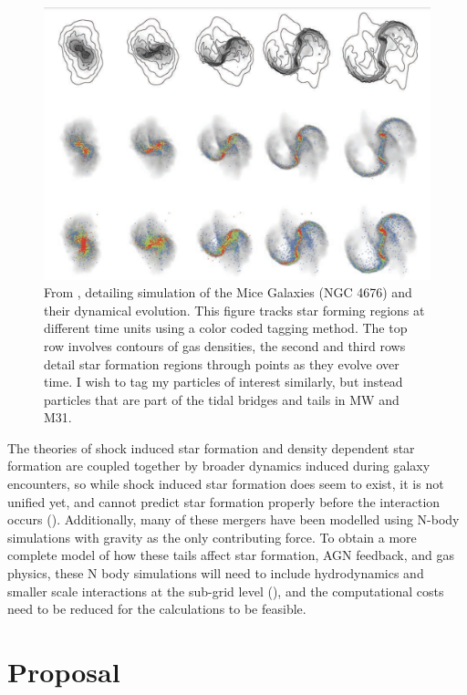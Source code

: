 \documentclass[linenumbers]{aastex631}
\begin{document}
    \begin{figure}[h!]
        \centering
        \includegraphics[scale = 0.3]{galaxy_fig.png}
        \caption{From \cite{barnes2004shock}, detailing simulation of the Mice Galaxies (NGC 4676) and their dynamical evolution. This figure tracks star forming regions at different time units using a color coded tagging method. The top row involves contours of gas densities, the second and third rows detail star formation regions through points as they evolve over time. I wish to tag my particles of interest similarly, but instead particles that are part of the tidal bridges and tails in MW and M31. }
        \label{fig:evolution}
    \end{figure}

    The theories of shock induced star formation and density dependent star formation are coupled together by broader dynamics induced during galaxy encounters, so while shock induced star formation does seem to exist, it is not unified yet, and cannot predict star formation properly before the interaction occurs (\cite{barnes2004shock}). Additionally, many of these mergers have been modelled using N-body simulations with gravity as the only contributing force. To obtain a more complete model of how these tails affect star formation, AGN feedback, and gas physics, these N body simulations will need to include hydrodynamics and smaller scale interactions at the sub-grid level (\cite{privon2013dynamical}), and the computational costs need to be reduced for the calculations to be feasible.


\section{Proposal} \label{sec:style}
\end{document}
